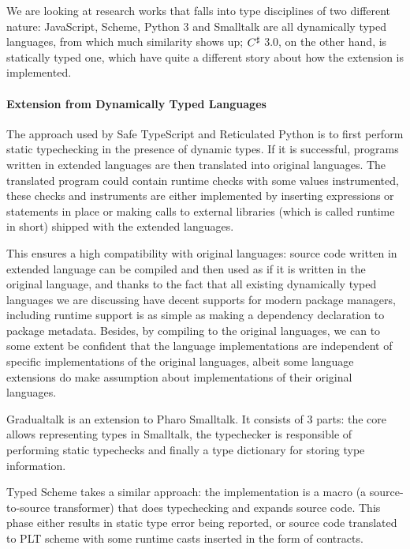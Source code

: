 We are looking at research works that falls into type disciplines of two different nature:
JavaScript, Scheme, Python 3 and Smalltalk are all dynamically typed languages, from which
much similarity shows up;
$C^\sharp$ 3.0, on the other hand, is statically typed one,
which have quite a different story about how the extension is implemented.

\paragraph{Extension from Dynamically Typed Languages}

The approach used by Safe TypeScript and Reticulated Python
is to first perform static typechecking in the presence of dynamic types.
If it is successful, programs written in extended languages are then translated into original languages.
The translated program could contain runtime checks with some values instrumented,
these checks and instruments are either implemented by inserting expressions or statements in place or
making calls to external libraries (which is called runtime in short) shipped with
the extended languages.

This ensures a high compatibility with original languages: source code written in extended language
can be compiled and then used as if it is written in the original language, and thanks to the fact
that all existing dynamically typed languages
we are discussing have decent supports for modern package managers,
including runtime support is as simple as making a dependency declaration to package metadata.
Besides, by compiling to the original languages,
we can to some extent be confident that the language implementations
are independent of specific implementations of the original languages,
albeit some language extensions do make assumption about implementations of their original languages.



Gradualtalk is an extension to Pharo Smalltalk. It consists of 3 parts:
the core allows representing types in Smalltalk, the typechecker
is responsible of performing static typechecks and finally
a type dictionary for storing type information.

Typed Scheme takes a similar approach: the implementation is a macro
(a source-to-source transformer) that does typechecking and expands source code.
This phase either results in static type error being reported,
or source code translated to PLT scheme with some runtime casts inserted
in the form of contracts.

